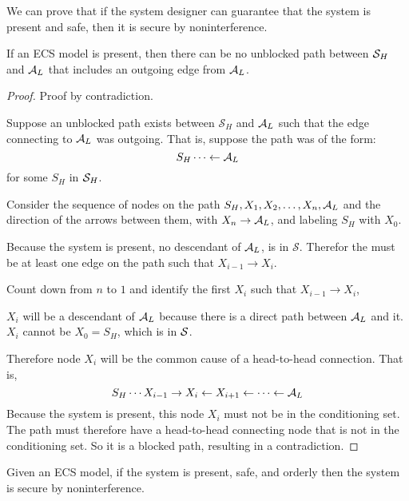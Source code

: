 \documentclass[../thesis.tex]{subfiles}
\begin{document}
We can prove that if the system designer can guarantee
that the system is present and safe, then it is secure
by noninterference.

\begin{lem}
  \label{lem:present}
  If an ECS model is present,
  then there can be no unblocked path between
  $\mathcal{S}_H$ and $\mathcal{A}_L$ that includes an outgoing
  edge from $\mathcal{A}_L$.
\end{lem}
\begin{proof}
  Proof by contradiction.
  
  Suppose an unblocked path exists
  between $\mathcal{S}_H$ and $\mathcal{A}_L$
  such that the edge connecting to $\mathcal{A}_L$ was outgoing.
  That is, suppose the path was of the form:
  $$S_H \cdots \leftarrow \mathcal{A}_L$$
  for some $S_H$ in $\mathcal{S}_H$.

  Consider the sequence of nodes on the path
  $S_H, X_1, X_2, \ldots, X_n, \mathcal{A}_L$ and the direction of
  the arrows between them, with $X_n \rightarrow \mathcal{A}_L$,
  and labeling
  $S_H$ with $X_0$.

  Because the system is present, no descendant of $\mathcal{A}_L$,
  is in $\mathcal{S}$.
  Therefor the must be at least one edge on the path
  such that $X_{i-1} \rightarrow X_i$.

  Count down from $n$ to $1$ and identify the first
  $X_i$ such that $X_{i-1} \rightarrow X_i$, 
 
  $X_i$ will be a descendant of $\mathcal{A}_L$ because
  there is a direct path between $\mathcal{A}_L$ and it.
  $X_i$ cannot be $X_0 = S_H$, which is in $\mathcal{S}$.

  Therefore node $X_i$ will be the common cause of a
  head-to-head connection.  That is,
  \[S_H \cdots X_{i-1} \rightarrow X_i \leftarrow X_{i+1} \leftarrow \cdots \leftarrow \mathcal{A}_L \]
  Because the system is present, this node
  $X_i$ must not be in the conditioning set.
  The path must therefore have a head-to-head
  connecting node that is not in the conditioning
  set.
  So it is a blocked path, resulting in a contradiction.
\end{proof}

\begin{thm}
  \label{thm:ecs-noninterference}
  Given an ECS model,
  if the system is present, safe, and orderly
  then the system
  is secure by noninterference.
\end{thm}
\end{document}
